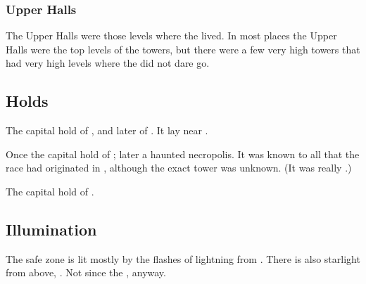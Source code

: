\subsubsection{Upper Halls}
The Upper Halls were those levels where the \resphain lived.
In most places the Upper Halls were the top levels of the towers, but there were a few very high towers that had very high levels where the \resphain did not dare go.








\subsection{Holds}





\begin{gloss}



  \gitem{\Cathedon}
  The capital hold of , and later of \CiriathSepher. 
  It lay near \Hyardes. 



  \gitem[Hyardes]{\Hyardes}
  Once the capital hold of ; later a haunted necropolis.
  It was known to all \resphain that the \resphan race had originated in \Tarcharos, although the exact tower was unknown. 
  (It was really .)



  \gitem{\Surammas}
  The capital hold of \Mystraacht. 



\end{gloss}









\subsection{Illumination}
The \resphan{} safe zone is lit mostly by the flashes of lightning from . 
There is also starlight from above, . 
Not since the , anyway. 





